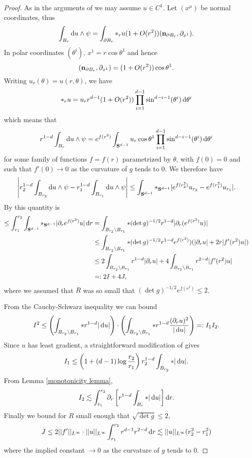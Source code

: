 \begin{proof}
As in the arguments of \cite[Chapter 5]{Giusti77} we may assume $u \in C^1$.
Let $(x^\mu)$ be normal coordinates, thus
$$\int_{B_r} \mathop{}\!\mathrm{d} u \wedge \psi = \int_{\partial B_r} *_r u(1 + O(r^2))(\mathbf n_{\partial B_r}, \partial_{x^1}).$$
In polar coordinates $(\theta^i)$, $x^1 = r \cos \theta^1$ and hence
$$(\mathbf n_{\partial B_r}, \partial_{x^1}) = (1 + O(r^2)) \cos \theta^1.$$
Writing $u_r(\theta) = u(r, \theta)$, we have
$$*_r u = u_r r^{d - 1}(1 + O(r^2)) \prod_{i=1}^{d - 1} \sin^{d - i - 1}(\theta^i) \mathop{}\!\mathrm{d} \theta^i$$
which means that
$$r^{1 - d} \int_{B_r} \mathop{}\!\mathrm{d} u \wedge \psi = e^{f(r^2)} \int_{\mathbf S^{d - 1}} u_r \cos \theta^1 \prod_{i=1}^{d - 1} \sin^{d - i - 1}(\theta^i) \mathop{}\!\mathrm{d} \theta^i$$
for some family of functions $f = f(r)$ parametrized by $\theta$, with $f(0) = 0$ and such that $f'(0) \to 0$ as the curvature of $g$ tends to $0$.
We therefore have
$$
\left|r_2^{1 - d} \int_{B_{r_2}} \mathop{}\!\mathrm{d} u \wedge \psi - r_1^{1 - d} \int_{B_{r_1}} \mathop{}\!\mathrm{d} u \wedge \psi \right| \leq \int_{\mathbf S^{d - 1}} *_{\mathbf S^{d - 1}} |e^{f(r_2^2)} u_{r_2} - e^{f(r_1^2)} u_{r_1}|.$$
By \cite[Lemma 5.3]{Giusti77} this quantity is
\begin{align*}
\leq \int_{r_1}^{r_2} \int_{\mathbf S^{d - 1}} *_{\mathbf S^{d - 1}} |\partial_r e^{f(r^2)}u| \mathop{}\!\mathrm{d} r &= \int_{B_{r_2} \setminus B_{r_1}} *(\det g)^{-1/2}r^{1 - d}|\partial_r (e^{f(r^2)}u)|\\
&\leq \int_{B_{r_2} \setminus B_{r_1}} *(\det g)^{-1/2}r^{1 - d}e^{f(r^2)})(|\partial_ru| + 2r|f'(r^2)u|)\\
&\leq 2\int_{B_{r_2} \setminus B_{r_1}} r^{1 - d}|\partial_ru| + 4\int_{B_{r_2} \setminus B_{r_1}} r^{2-d} |f'(r^2)u|\\
&=: 2I + 4J,
\end{align*}
where we assumed that $R$ was so small that $(\det g)^{-1/2} e^{f(r^2)} \leq 2$.

From the Cauchy-Schwarz inequality we can bound
$$I^2 \leq \left(\int_{B_{r_2} \setminus B_{r_1}} *r^{1 - d}|\mathop{}\!\mathrm{d} u|\right) \cdot \left(\int_{B_{r_2} \setminus B_{r_1}} *r^{1 - d} \frac{(\partial_r u)^2}{|\mathop{}\!\mathrm{d} u|}\right) =: I_1I_2.$$
Since $u$ has least gradient, a straightforward modification of \cite[Lemma 5.11]{Giusti77} gives
$$I_1 \leq \left(1 + (d - 1) \log \frac{r_2}{r_1}\right) r_2^{1 - d} \int_{B_{r_2}} *|\mathop{}\!\mathrm{d} u|.$$
From Lemma \ref{monotonicity lemma},
$$I_2 \lesssim \int_{r_1}^{r_2} \partial_r \left[r^{1 - d}\int_{B_r} *|\mathop{}\!\mathrm{d} u|\right] \mathop{}\!\mathrm{d} r.$$
Finally we bound for $R$ small enough that $\sqrt{\det g} \leq 2$,
$$J \leq 2 ||f'||_{L^\infty} \cdot ||u||_{L^\infty} \int_{r_1}^{r_2} r^{d - 1}r^{2 - d} \mathop{}\!\mathrm{d} r \lesssim ||u||_{L^\infty} (r_2^2 - r_1^2)$$
where the implied constant $\to 0$ as the curvature of $g$ tends to $0$.
\end{proof}

